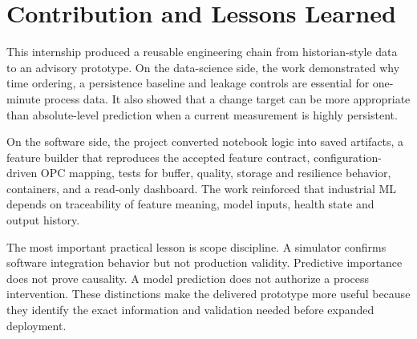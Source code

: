\chapter{Contribution and Lessons Learned}
This internship produced a reusable engineering chain from historian-style data to an advisory prototype. On the data-science side, the work demonstrated why time ordering, a persistence baseline and leakage controls are essential for one-minute process data. It also showed that a change target can be more appropriate than absolute-level prediction when a current measurement is highly persistent.

On the software side, the project converted notebook logic into saved artifacts, a feature builder that reproduces the accepted feature contract, configuration-driven OPC mapping, tests for buffer, quality, storage and resilience behavior, containers, and a read-only dashboard. The work reinforced that industrial ML depends on traceability of feature meaning, model inputs, health state and output history.

The most important practical lesson is scope discipline. A simulator confirms software integration behavior but not production validity. Predictive importance does not prove causality. A model prediction does not authorize a process intervention. These distinctions make the delivered prototype more useful because they identify the exact information and validation needed before expanded deployment.
